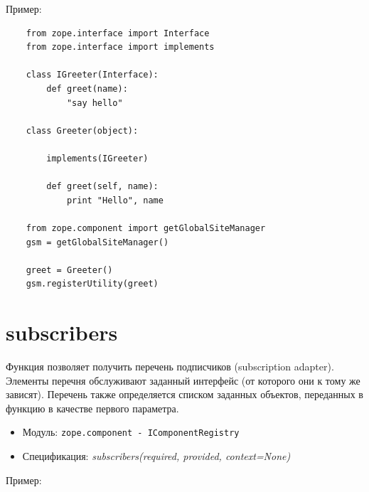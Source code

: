 \documentclass[a4paper,openany,twoside,final]{book}
\providecommand*{\DUroletitlereference}[1]{\textsl{#1}}
\begin{document}
Пример:

\begin{verbatim}
    from zope.interface import Interface
    from zope.interface import implements

    class IGreeter(Interface):
        def greet(name):
            "say hello"

    class Greeter(object):

        implements(IGreeter)

        def greet(self, name):
            print "Hello", name

    from zope.component import getGlobalSiteManager
    gsm = getGlobalSiteManager()

    greet = Greeter()
    gsm.registerUtility(greet)
\end{verbatim}


\section*{subscribers%
  \label{subscribers}%
}

Функция позволяет получить перечень подписчиков (subscription adapter).  Элементы перечня обслуживают заданный интерфейс (от которого они к тому же зависят).  Перечень также определяется списком заданных объектов, переданных в функцию в качестве первого параметра.

\begin{itemize}

\item Модуль: \texttt{zope.component - IComponentRegistry}

\item Спецификация: \DUroletitlereference{subscribers(required, provided, context=None)}

\end{itemize}

Пример:
\end{document}
